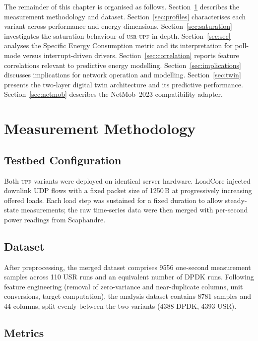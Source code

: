\documentclass[12pt, a4paper]{report}
\newcommand{\usr}{\textsc{usr-upf}}
\newcommand{\upf}{\textsc{upf}}
\begin{document}
The remainder of this chapter is organised as follows.
Section~\ref{sec:methodology} describes the measurement methodology and
dataset.
Section~\ref{sec:profiles} characterises each variant across performance
and energy dimensions.
Section~\ref{sec:saturation} investigates the saturation behaviour of
\usr{} in depth.
Section~\ref{sec:sec} analyses the Specific Energy Consumption metric and
its interpretation for poll-mode versus interrupt-driven drivers.
Section~\ref{sec:correlation} reports feature correlations relevant to
predictive energy modelling.
Section~\ref{sec:implications} discusses implications for network operation
and modelling.
Section~\ref{sec:twin} presents the two-layer digital twin architecture and
its predictive performance.
Section~\ref{sec:netmob} describes the NetMob~2023 compatibility adapter.

\section{Measurement Methodology}
\label{sec:methodology}

\subsection{Testbed Configuration}

Both \upf{} variants were deployed on identical server hardware.
LoadCore injected downlink UDP flows with a fixed packet size of
1250\,B at progressively increasing offered loads.
Each load step was sustained for a fixed duration to allow steady-state
measurements; the raw time-series data were then merged with per-second power
readings from Scaphandre.

\subsection{Dataset}

After preprocessing, the merged dataset comprises 9556 one-second
measurement samples across 110 USR runs and an equivalent number of
DPDK runs.
Following feature engineering (removal of zero-variance and near-duplicate
columns, unit conversions, target computation), the analysis dataset contains
8781 samples and 44 columns, split evenly between the two variants
(4388 DPDK, 4393 USR).

\subsection{Metrics}
\end{document}
